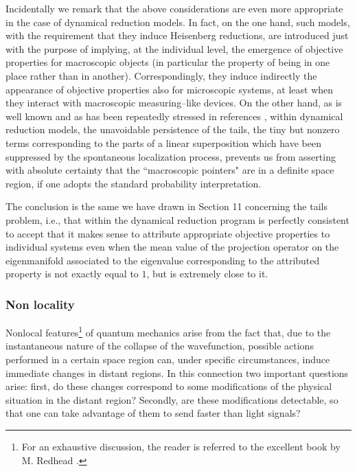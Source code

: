 \documentclass[12pt]{article}
\begin{document}
Incidentally we remark that the above considerations are even more
appropriate in the case of dynamical reduction models. In fact, on
the one hand, such models, with the requirement that they induce
Heisenberg reductions, are introduced just with the purpose of
implying, at the individual level, the emergence of objective
properties for macroscopic objects (in particular the property of
being in one place rather than in another). Correspondingly, they
induce indirectly the appearance of objective properties also for
microscopic systems, at least when they interact with macroscopic
measuring--like devices. On the other hand, as is well known and
as has been repeatedly stressed in references
\cite{rel,gprfqm,p62}, within dynamical reduction models, the
unavoidable persistence of the tails, the tiny but nonzero terms
corresponding to the parts of a linear superposition which have
been suppressed by the spontaneous localization process, prevents
us from asserting with absolute certainty that the ``macroscopic
pointers" are in a definite space region, if one adopts the
standard probability interpretation.

The conclusion is the same we have drawn in Section 11 concerning the
tails problem, i.e., that within the dynamical reduction program is
perfectly consistent to accept that it makes
sense to attribute appropriate objective properties to individual
systems  even
when the mean value of the projection operator on the eigenmanifold
associated to the eigenvalue corresponding to the attributed property is
not exactly equal to $1$, but is extremely close to it.

\subsubsection{Non locality} \label{sec1012}

Nonlocal features\footnote{For an exhaustive discussion, the
reader is referred to the excellent book by M. Redhead
\cite{redb}.} of quantum mechanics arise from the fact that, due
to the instantaneous nature of the collapse of the wavefunction,
possible actions performed in a certain space region can, under
specific circumstances, induce immediate changes in distant
regions. In this connection two important questions arise: first,
do these changes correspond to some modifications of the physical
situation in the distant region? Secondly, are these modifications
detectable, so that one can take advantage of them to send faster
than light signals?
\end{document}
